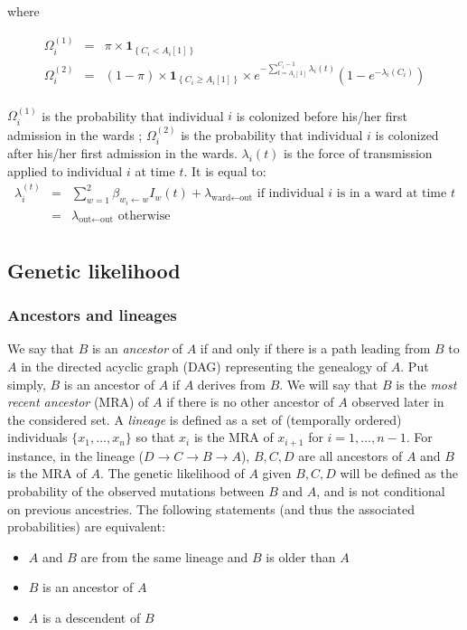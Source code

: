 \documentclass[10pt]{article}
\begin{document}
where

\begin{eqnarray*}
\Omega_i^{\left(1\right)} & = & \pi \times \mathbf{1}_{\left\lbrace C_i < A_i[1] \right\rbrace}  \\
\Omega_i^{\left(2\right)}  & = & \left( 1-\pi \right) \times \mathbf{1}_{\left\lbrace C_i \geq A_i[1] \right\rbrace} \times e^{-\sum_{t=A_i[1]}^{C_i-1}\lambda_i\left(t\right)} \left( 1 - e^{-\lambda_i\left(C_i\right)} \right) \\
\end{eqnarray*}
\bigskip

$\Omega_i^{\left(1\right)}$ is the probability that individual $i$ is colonized before his/her first admission in the wards ; $\Omega_i^{\left(2\right)}$ is the probability that individual $i$ is colonized after his/her first admission in the wards. 
$\lambda_i\left(t\right)$ is the force of transmission applied to individual $i$ at time $t$. It is equal to: 
\begin{eqnarray*}
\lambda_i^{\left(t\right)} & = & \sum_{w=1}^{2} \beta_{w_i \leftarrow w} I_w\left(t\right) + \lambda_{\text{ward} \leftarrow \text{out}} \text{ if individual $i$ is in a ward at time $t$}  \\
 & = & \lambda_{\text{out} \leftarrow \text{out}} \text{ otherwise}\\
\end{eqnarray*}


\subsection*{Genetic likelihood}


\subsubsection*{Ancestors and lineages}
\noindent We say that $B$ is an \textit{ancestor} of $A$ if and only if there is a path leading from $B$ to $A$ in the directed acyclic graph (DAG) representing the genealogy of $A$.
Put simply, $B$ is an ancestor of $A$ if $A$ derives from $B$.
We will say that $B$ is the \textit{most recent ancestor} (MRA) of $A$ if there is no other ancestor of $A$ observed later in the considered set.
A \textit{lineage} is defined as a set of (temporally ordered) individuals $\{x_1, ..., x_n\}$ so that $x_i$ is the MRA of $x_{i+1}$ for $i=1,\ldots,n-1$.
For instance, in the lineage ($D \rightarrow C \rightarrow B \rightarrow A$), $B,C,D$ are all ancestors of $A$ and $B$ is the MRA of $A$.
The genetic likelihood of $A$ given $B,C,D$ will be defined as the probability of the observed mutations between $B$ and $A$, and is not conditional on previous ancestries.
The following statements (and thus the associated probabilities) are equivalent:
\begin{itemize}
 \item $A$ and $B$ are from the same lineage and $B$ is older than $A$
 \item $B$ is an ancestor of $A$
 \item $A$ is a descendent of $B$
\end{itemize}
\end{document}
